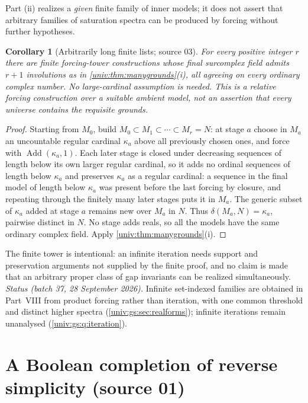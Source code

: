 \documentclass[11pt,letterpaper]{article}
\numberwithin{equation}{section}
\newtheorem{corollary}[corollary]{Corollary}
\theoremstyle{definition}
\theoremstyle{remark}
\newcommand{\Add}{\operatorname{Add}}
\begin{document}
Part (ii) realizes a \emph{given} finite family of inner models; it does not
assert that arbitrary families of saturation spectra can be produced by
forcing without further hypotheses.

\begin{corollary}[Arbitrarily long finite lists; source 03]\label{univ:cor:finitetower}
For every positive integer $r$ there are finite forcing-tower constructions
whose final surcomplex field admits $r+1$ involutions as in
\cref{univ:thm:manygrounds}(i), all agreeing on every ordinary complex number.
No large-cardinal assumption is needed. This is a relative forcing
construction over a suitable ambient model, not an assertion that every
universe contains the requisite grounds.
\end{corollary}
\begin{proof}
Starting from $M_0$, build $M_0\subset M_1\subset\cdots\subset M_r=N$: at stage
$a$ choose in $M_a$ an uncountable regular cardinal $\kappa_a$ above all
previously chosen ones, and force with $\Add(\kappa_a,1)$. Each later stage is
closed under decreasing sequences of length below its own larger regular
cardinal, so it adds no ordinal sequences of length below $\kappa_a$ and
preserves $\kappa_a$ as a regular cardinal: a sequence in the final model of
length below $\kappa_a$ was present before the last forcing by closure, and
repeating through the finitely many later stages puts it in $M_a$. The generic
subset of $\kappa_a$ added at stage $a$ remains new over $M_a$ in $N$. Thus
$\delta(M_a,N)=\kappa_a$, pairwise distinct in $N$. No stage adds reals, so all
the models have the same ordinary complex field. Apply
\cref{univ:thm:manygrounds}(i).
\end{proof}

The finite tower is intentional: an infinite iteration needs support and
preservation arguments not supplied by the finite proof, and no claim is made
that an arbitrary proper class of gap invariants can be realized
simultaneously. \emph{Status (batch 37, 28 September 2026).} Infinite
set-indexed families are obtained in Part~VIII from product forcing rather than
iteration, with one common threshold and distinct higher spectra
(\cref{univ:gs:sec:realforms}); infinite iterations remain unanalysed
(\cref{univ:gs:q:iteration}).

\part{A Boolean completion of reverse simplicity (source 01)}\label{univ:part:boolean}
\end{document}
